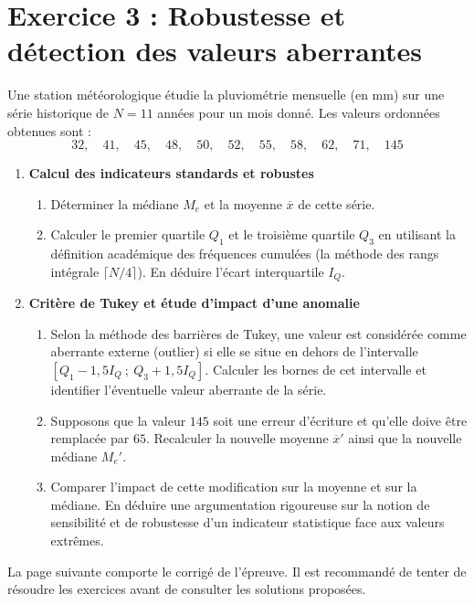 \documentclass[11pt,a4paper]{article}
\begin{document}
\section*{Exercice 3 : Robustesse et détection des valeurs aberrantes}

Une station météorologique étudie la pluviométrie mensuelle (en mm) sur une série historique de $N = 11$ années pour un mois donné. Les valeurs ordonnées obtenues sont :
\[ 32, \quad 41, \quad 45, \quad 48, \quad 50, \quad 52, \quad 55, \quad 58, \quad 62, \quad 71, \quad 145 \]

\begin{enumerate}
    \item \textbf{Calcul des indicateurs standards et robustes}
    \begin{enumerate}
        \item Déterminer la médiane $M_e$ et la moyenne $\overline{x}$ de cette série.
        \item Calculer le premier quartile $Q_1$ et le troisième quartile $Q_3$ en utilisant la définition académique des fréquences cumulées (la méthode des rangs intégrale $\lceil N/4 \rceil$). En déduire l'écart interquartile $I_Q$.
    \end{enumerate}

    \item \textbf{Critère de Tukey et étude d'impact d'une anomalie}
    \begin{enumerate}
        \item Selon la méthode des barrières de Tukey, une valeur est considérée comme aberrante externe (outlier) si elle se situe en dehors de l'intervalle $[Q_1 - 1,5 I_Q \ ; \ Q_3 + 1,5 I_Q]$. Calculer les bornes de cet intervalle et identifier l'éventuelle valeur aberrante de la série.
        \item Supposons que la valeur $145$ soit une erreur d'écriture et qu'elle doive être remplacée par $65$. Recalculer la nouvelle moyenne $\overline{x}'$ ainsi que la nouvelle médiane $M_e'$.
        \item Comparer l'impact de cette modification sur la moyenne et sur la médiane. En déduire une argumentation rigoureuse sur la notion de sensibilité et de robustesse d'un indicateur statistique face aux valeurs extrêmes.
    \end{enumerate}
\end{enumerate}

\newpage
\noindent La page suivante comporte le corrigé de l'épreuve. Il est recommandé de tenter de résoudre les exercices avant de consulter les solutions proposées.
\end{document}
